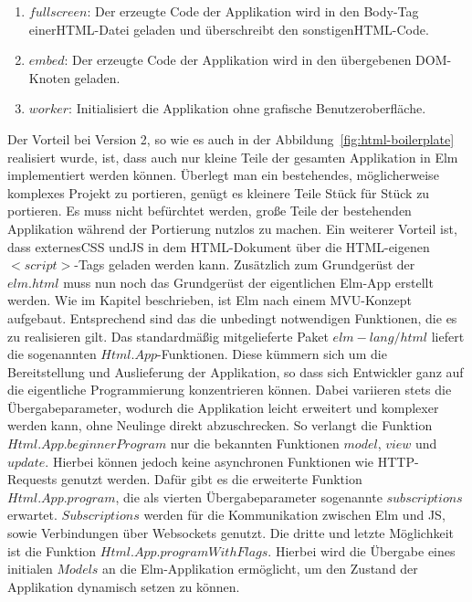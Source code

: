 \begin{enumerate}
\item$fullscreen$: Der erzeugte Code der Applikation wird in den Body-Tag einer\ac{HTML}-Datei geladen und überschreibt den sonstigen\ac{HTML}-Code.

\item$embed$: Der erzeugte Code der Applikation wird in den übergebenen DOM-Knoten geladen.

\item$worker$: Initialisiert die Applikation ohne grafische Benutzeroberfläche.
\end{enumerate}
Der Vorteil bei Version 2, so wie es auch in der Abbildung~\ref{fig:html-boilerplate} realisiert wurde, ist, dass auch nur kleine Teile der gesamten Applikation in Elm implementiert werden können. Überlegt man ein bestehendes, möglicherweise komplexes Projekt zu portieren, genügt es kleinere Teile Stück für Stück zu portieren. Es muss nicht befürchtet werden, große Teile der bestehenden Applikation während der Portierung nutzlos zu machen. Ein weiterer Vorteil ist, dass externes\ac{CSS} und\ac{JS} in dem \ac{HTML}-Dokument über die \ac{HTML}-eigenen $<script>$-Tags geladen werden kann.
Zusätzlich zum Grundgerüst der $elm.html$ muss nun noch das Grundgerüst der eigentlichen Elm-App erstellt werden. Wie im Kapitel  beschrieben, ist Elm nach einem \ac{MVU}-Konzept aufgebaut. Entsprechend sind das die unbedingt notwendigen Funktionen, die es zu realisieren gilt. Das standardmäßig mitgelieferte Paket $elm-lang/html$ liefert die sogenannten $Html.App$-Funktionen. Diese kümmern sich um die Bereitstellung und Auslieferung der Applikation, so dass sich Entwickler ganz auf die eigentliche Programmierung konzentrieren können. Dabei variieren stets die Übergabeparameter, wodurch die Applikation leicht erweitert und komplexer werden kann, ohne Neulinge direkt abzuschrecken. So verlangt die Funktion $Html.App.beginnerProgram$ nur die bekannten Funktionen $model$, $view$ und $update$. Hierbei können jedoch keine asynchronen Funktionen wie \ac{HTTP}-Requests genutzt werden.
Dafür gibt es die erweiterte Funktion $Html.App.program$, die als vierten Übergabeparameter sogenannte $subscriptions$ erwartet. $Subscriptions$ werden für die Kommunikation zwischen Elm und \ac{JS}, sowie Verbindungen über Websockets genutzt.
Die dritte und letzte Möglichkeit ist die Funktion $Html.App.programWithFlags$. Hierbei wird die Übergabe eines initialen $Models$ an die Elm-Applikation ermöglicht, um den Zustand der Applikation dynamisch setzen zu können.
